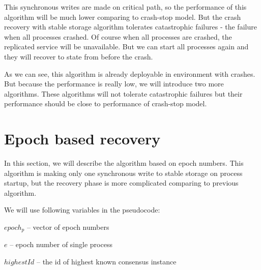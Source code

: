 This synchronous writes are made on critical path, so the performance of this algorithm will be much lower comparing to crash-stop model. But the crash recovery with stable storage algorithm tolerates catastrophic failures - the failure when all processes crashed. Of course when all processes are crashed, the replicated service will be unavailable. But we can start all processes again and they will recover to state from before the crash.

As we can see, this algorithm is already deployable in environment with crashes. But because the performance is really low, we will introduce two more algorithms. These algorithms will not tolerate catastrophic failures but their performance should be close to performance of crash-stop model.

\section{Epoch based recovery}
\label{sec:epoch_ss}

In this section, we will describe the algorithm based on epoch numbers. This algorithm is making only one synchronous write to stable storage on process startup, but the recovery phase is more complicated comparing to previous algorithm.

We will use following variables in the pseudocode:
\begin{tightList}[\setlength{\labelwidth}{20em} \setlength{\leftmargin}{3\leftmargin}]
  \item[$epoch_p$] -- vector of epoch numbers
  \item[$e$] -- epoch number of single process
  \item[$highestId$] -- the id of highest known consensus instance
\end{tightList}


